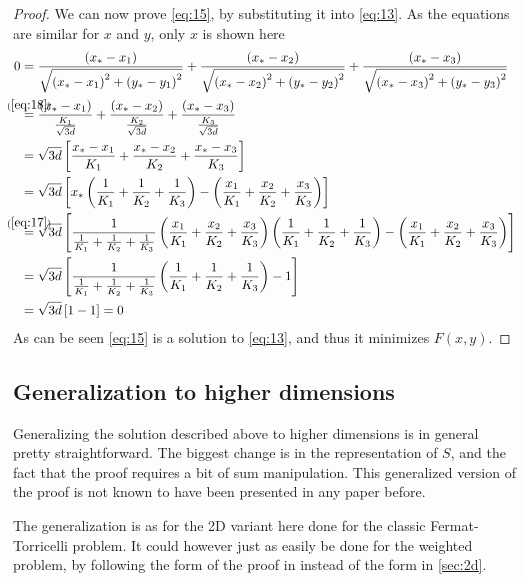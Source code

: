 \begin{proof}
We can now prove \cref{eq:15}, by substituting it into \cref{eq:13}. As the
equations are similar for $x$ and $y$, only $x$ is shown here
%
\begin{align}
  0
  &= \frac{(x_\ast - x_1)}{\sqrt{{(x_\ast - x_1)}^2 + {(y_\ast - y_1)}^2}} +
    \frac{(x_\ast - x_2)}{\sqrt{{(x_\ast - x_2)}^2 + {(y_\ast - y_2)}^2}} +
    \frac{(x_\ast - x_3)}{\sqrt{{(x_\ast - x_3)}^2 + {(y_\ast - y_3)}^2}} \\
  &\stackrel{\mathclap{(\ref{eq:18})}}=
    \frac{(x_\ast - x_1)}{\frac{K_1}{\sqrt{3 d}}} +
    \frac{(x_\ast - x_2)}{\frac{K_2}{\sqrt{3 d}}} +
    \frac{(x_\ast - x_3)}{\frac{K_3}{\sqrt{3 d}}} \\
  &= \sqrt{3 d} \left[
    \frac{x_\ast - x_1}{K_1} +
    \frac{x_\ast - x_2}{K_2} +
    \frac{x_\ast - x_3}{K_3} \right] \\
  &= \sqrt{3 d} \left[
    x_\ast \left( \frac{1}{K_1} + \frac{1}{K_2} + \frac{1}{K_3} \right) -
    \left( \frac{x_1}{K_1} + \frac{x_2}{K_2} + \frac{x_3}{K_3} \right)
    \right] \\
  &\stackrel{\mathclap{(\ref{eq:17})}}=
    \sqrt{3 d} \left[
    \frac{1}{\frac{1}{K_1} + \frac{1}{K_2} + \frac{1}{K_3}} \left( \frac{x_1}{K_1} +
    \frac{x_2}{K_2} + \frac{x_3}{K_3} \right)
    \left( \frac{1}{K_1} + \frac{1}{K_2} + \frac{1}{K_3} \right) -
    \left( \frac{x_1}{K_1} + \frac{x_2}{K_2} + \frac{x_3}{K_3} \right)
    \right] \\
  &= \sqrt{3 d} \left[
    \frac{1}{\frac{1}{K_1} + \frac{1}{K_2} + \frac{1}{K_3}}
    \left( \frac{1}{K_1} + \frac{1}{K_2} + \frac{1}{K_3} \right) -
    1 \right] \\
  &= \sqrt{3 d} \left[ 1 - 1 \right] = 0
\end{align}
%
As can be seen \cref{eq:15} is a solution to \cref{eq:13}, and thus it minimizes
$F(x,y)$.
\end{proof}

\subsection{Generalization to higher dimensions}
\label{sec:gener-high-dimens}

Generalizing the solution described above to higher dimensions is in general
pretty straightforward. The biggest change is in the representation of $S$, and
the fact that the proof requires a bit of sum manipulation. This generalized
version of the proof is not known to have been presented in any paper before.

The generalization is as for the 2D variant here done for the classic
Fermat-Torricelli problem. It could however just as easily be done for the
weighted problem, by following the form of the proof in \textcite{uteshev2014}
instead of the form in \cref{sec:2d}.

